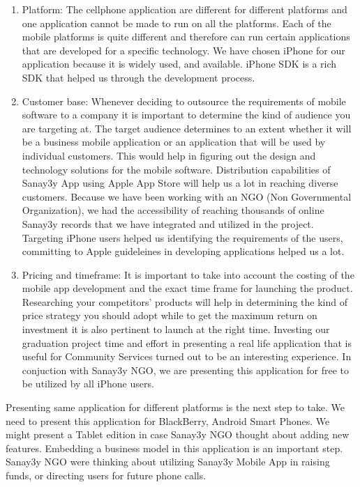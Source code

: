 \documentclass[12pt,a4paper,final,twoside,onecolumn,titlepage]{book}
\begin{document}
\begin{enumerate}
\item Platform: The cellphone application are different for different platforms and one application cannot be made to run on all the platforms. Each of the mobile platforms is quite different and therefore can run certain applications that are developed for a specific technology. We have chosen iPhone for our application because it is widely used, and available. iPhone SDK is a rich SDK that helped us through the development process. 

\item Customer base: Whenever deciding to outsource the requirements of mobile software to a company it is important to determine the kind of audience you are targeting at. The target audience determines to an extent whether it will be a business mobile application or an application that will be used by individual customers. This would help in figuring out the design and technology solutions for the mobile software. Distribution capabilities of Sanay3y App using Apple App Store will help us a lot in reaching diverse customers. Because we have been working with an NGO (Non Governmental Organization), we had the accessibility of reaching thousands of online Sanay3y records that we have integrated and utilized in the project. Targeting iPhone users helped us identifying the requirements of the users, committing to Apple guideleines in developing applications helped us a lot.

\item Pricing and timeframe: It is important to take into account the costing of the mobile app development and the exact time frame for launching the product. Researching your competitors’ products will help in determining the kind of price strategy you should adopt while to get the maximum return on investment it is also pertinent to launch at the right time. Investing our graduation project time and effort in presenting a real life application that is useful for Community Services turned out to be an interesting experience. In conjuction with Sanay3y NGO, we are presenting this application for free to be utilized by all iPhone users.
\end{enumerate}

Presenting same application for different platforms is the next step to take. We need to present this application for BlackBerry, Android Smart Phones. We might present a Tablet edition in case Sanay3y NGO thought about adding new features. Embedding a business model in this application is an important step. Sanay3y NGO were thinking about utilizing Sanay3y Mobile App in raising funds, or directing users for future phone calls.
\end{document}
